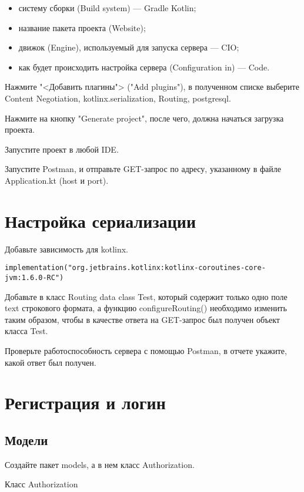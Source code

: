 \begin{itemize}
	\item систему сборки (Build system) --- Gradle Kotlin;
	\item название пакета проекта (Website);
	\item движок (Engine), используемый для запуска сервера --- CIO;
	\item как будет происходить настройка сервера
			(Configuration in) --- Code.
\end{itemize}

Нажмите "<Добавить плагины"> ("Add plugins"),
в полученном списке выберите Content Negotiation,
kotlinx.serialization, Routing, postgresql.\par
Нажмите на кнопку "Generate project",
после чего, должна начаться загрузка проекта.\par
Запустите проект в любой IDE.\par
Запустите Postman, и отправьте GET-запрос по адресу,
указанному в файле Application.kt (host и port).

\section{Настройка сериализации}

Добавьте зависимость для kotlinx.

\begin{verbatim}
implementation("org.jetbrains.kotlinx:kotlinx-coroutines-core-jvm:1.6.0-RC")
\end{verbatim}

Добавьте в класс Routing data class Test,
который содержит только одно поле text строкового формата,
а функцию configureRouting() необходимо изменить таким образом,
чтобы в качестве ответа на GET-запрос был получен объект
класса Test.\par
Проверьте работоспособность сервера с помощью Postman, в отчете
укажите, какой ответ был получен. 

\section{Регистрация и логин}

\subsection{Модели}

Создайте пакет models, а в нем класс Authorization.

\begin{image}
	\caption{Класс Authorization}
    \label{fig:loginremote}
\end{image}

